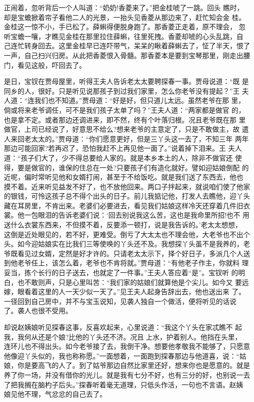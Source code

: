正闹着，忽听背后一个人叫道：“奶奶!香菱来了。”把金桂唬了一跳。回头
瞧时，却是宝蟾掀着帘子看他二人的光景，一抬头见香菱从那边来了，赶忙知会金
桂。金桂这一惊不小，手已松了。薛蝌得便脱身跑了。那香菱正走着，原不理会，
忽听宝蟾一嚷，才瞧见金桂在那里拉住薛蝌，往里死拽。香菱却唬的心头乱跳，自
己连忙转身回去。这里金桂早已连吓带气，呆呆的瞅着薛蝌去了，怔了半天，恨了
一声，自己扫兴归房。从此把香菱恨入骨髓。那香菱本是要到宝琴那里，刚走出腰
门，看见这般，吓回去了。

是日，宝钗在贾母屋里，听得王夫人告诉老太太要聘探春一事。贾母说道：“既
是同乡的人，很好。只是听见说那孩子到过我们家里，怎么你老爷没有提起？”王
夫人道：“连我们也不知道。”贾母道：“好是好，但只道儿太远。虽然老爷在那
里，倘或将来老爷调任，可不是我们孩子太单了吗？”王夫人道：“两家都是做官
的，也是拿不定。或者那边还调进来，即不然，终有个叶落归根。况且老爷既在那
里做官，上司已经说了，好意思不给么?想来老爷的主意定了，只是不敢做主，故
遣人来回老太太的。”贾母道：“你们愿意更好，但是三丫头这一去了，不知三年
两年那边可能回家?若再迟了，恐怕我赶不上再见他一面了。”说着掉下泪来。王
夫人道：“孩子们大了，少不得总要给人家的。就是本乡本土的人，除非不做官还
使得，要是做官的，谁保的住总在一处?只要孩子们有造化就好。譬如迎姑娘倒配
的近呢，偏时常听见他和女婿打闹，甚至于不给饭吃。就是我们送了东西去，他也
摸不着。近来听见益发不好了，也不放他回来。两口子拌起来，就说咱们使了他家
的银钱，可怜这孩子总不得个出头的日子。前儿我掂记他，打发人去瞧他，迎丫头
藏在耳房里，不肯出来。老婆们必要进去，看见我们姑娘这样冷天还穿着几件旧衣
裳。他一包眼泪的告诉老婆们说：‘回去别说我这么苦，这也是我命里所招!也不
用送什么衣裳东西来，不但摸不着，反要添一顿打，说是我告诉的。’老太太想想，
这倒是近处眼见的，若不好，更难受。倒亏了大太太也不理会他，大老爷也不出个
头。如今迎姑娘实在比我们三等使唤的丫头还不及。我想探丫头虽不是我养的，老
爷既看见过女婿，定然是好才许的。只请老太太示下，择个好日子，多派几个人送
到他老爷任上，该怎么着，老爷也不肯将就。”贾母道：“有他老子作主，你就料
理妥当，拣个长行的日子送去，也就定了一件事。”王夫人答应着“是”。宝钗听
的明白，也不敢则声，只是心里叫苦：“我们家的姑娘们就算他是个尖儿。如今又
要远嫁，眼看着这里的人一天少似一天了。”见王夫人起身告辞出去，他也送出来
了。一径回到自己房中，并不与宝玉说知，见袭人独自一个做活，便将听见的话说
了。袭人也很不受用。

却说赵姨娘听见探春这事，反喜欢起来，心里说道：“我这个丫头在家忒瞧不
起我，我何从还是个娘?比他的丫头还不济。况且上水，护着别人。他挡在头里，
连环儿也不得出头。如今老爷接了去，我倒干净。想要他孝敬我不能够了，只愿意
他像迎丫头似的，我也称称愿。”一面想着，一面跑到探春那边与他道喜，说：“姑
娘，你是要高飞的人了。到了姑爷那边自然比家里还好，想来你也是愿意的。就是
养了你一场，并没有借你的光儿。就是我有七分不好，也有三分的好，也别说一去
了把我搁在脑杓子后头。”探春听着毫无道理，只低头作活，一句也不言语。赵姨
娘见他不理，气忿忿的自己去了。

